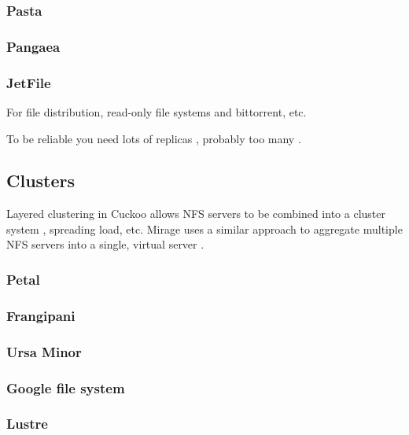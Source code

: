 \subsubsection{Pasta}
\cite{moreton}
\subsubsection{Pangaea}
\cite{saito02}
\cite{stein02}
\subsubsection{JetFile}
\cite{gronvall}

For file distribution, read-only file systems \cite{fu} and bittorrent, etc.

To be reliable you need lots of replicas \cite{rabin}, probably too many \cite{blake}.

\cite{kim}\cite{mummert}\cite{sobti}

\subsection{Clusters}

\cite{amiri}

Layered clustering in Cuckoo allows NFS servers to be combined into a cluster system \cite{klosterman}, spreading load, etc. Mirage uses a similar approach to aggregate multiple NFS servers into a single, virtual server \cite{baker02}.

\subsubsection{Petal}
\cite{lee95,lee96}
\subsubsection{Frangipani}
\cite{thekkath}
\subsubsection{Ursa Minor}
\cite{abd-el-malek}
\subsubsection{Google file system}
\cite{ghemawat}
\subsubsection{Lustre}
\cite{lustre}
